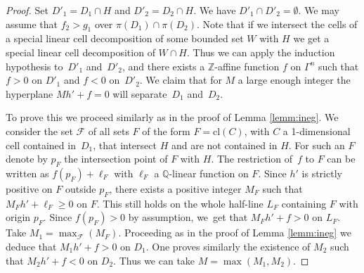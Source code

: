 \documentclass[JEP,XML,SOM,Unicode,ThmDefs,NoEqCountersInSection,published]{cedram}
\newcommand{\cl}{\mathrm{cl}}
\newcommand{\Q}{\mathbb Q}
\newcommand{\Z}{\mathbb Z}
\theoremstyle{plain}
\theoremstyle{definition}
\begin{document}
\begin{proof}
Set $D'_1= D_1\cap H$ and $D'_2 = D_2 \cap H$.
We have $D'_1 \cap D'_2 = \emptyset$.
We may assume that $f_2 > g_1$ over $\pi (D_1) \cap \pi (D_2)$.
Note that if we intersect the cells of a special linear cell decomposition of some bounded set $W$ with $H$ we get a special linear cell decomposition of $W \cap H$.
Thus we can apply the induction hypothesis to~$D'_1$ and~$D'_2$, and there exists a $\Z$-affine function $f$ on $\Gamma^n$
such that $f >0$ on $D'_1$ and $f <0$ on~$D'_2$.
We claim that for $M$ a large enough integer the hyperplane
$M h' +f = 0$ will separate~$D_1$ and~$D_2$.

To prove this we proceed similarly as in the proof of Lemma \ref{lemm:ineg}.
We consider the set $\mathcal{F}$ of all sets $F$ of the form $F = \cl (C)$, with $C$ a 1-dimensional cell contained in~$D_1$,
that intersect $H$ and are not contained in $H$.
For such an $F$ denote by
$p_F$ the intersection point of $F$ with $H$.
The restriction of~$f$ to
$F$ can be written as $f (p_F) + \ell_F$ with $\ell_F$ a $\Q$-linear function on $F$.
Since $h'$ is strictly positive on $F$ outside $p_F$,
there exists a positive integer $M_F$ such that $M_F h' + \ell_F \geq 0 $ on $F$.
This still holds on the whole half-line $L_F$ containing $F$ with origin $p_F$.
Since $f (p_F) > 0$ by assumption, we~get that $M_F h' + f > 0$ on $L_F$.
Take $M_1 = \max_{\mathcal{F}} (M_F)$.
Proceeding as in the proof of Lemma \ref{lemm:ineg} we deduce that
$M_1 h' + f >0$ on $D_1$.
One proves similarly the existence of $M_2$ such that
$M_2 h' + f <0$ on $D_2$. Thus we can take $M = \max (M_1, M_2)$.
\end{proof}
\end{document}
